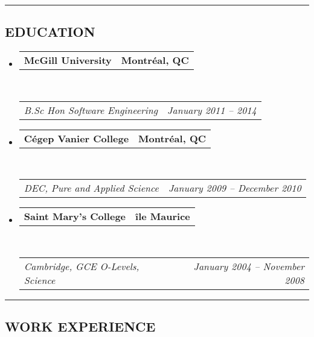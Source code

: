 \documentclass[10pt,letterpaper]{article}
\makeatletter
\newcommand{\headerrow}[2]
{\begin{tabular*}{\linewidth}{l@{\extracolsep{\fill}}r}
	#1 &
	#2 \\
\end{tabular*}}
\makeatother
\begin{document}
\hrule
\vspace{-0.4em}
\subsection*{EDUCATION}

\begin{itemize}
	\parskip=0.1em

	\item
	\headerrow
		{\textbf{McGill University}}
		{\textbf{Montr\'{e}al, QC}}
	\\
	\headerrow
		{\emph{B.Sc Hon Software Engineering}}
		{\emph{January 2011 -- 2014}}

	\item
	\headerrow
		{\textbf{C\'{e}gep Vanier College}}
		{\textbf{Montr\'{e}al, QC}}
	\\
	\headerrow
		{\emph{DEC, Pure and Applied Science}}
		{\emph{January 2009 -- December 2010}}

	\item
	\headerrow
		{\textbf{Saint Mary's College}}
		{\textbf{\^{i}le Maurice}}
	\\
	\headerrow
		{\emph{Cambridge, GCE O-Levels, Science}}
		{\emph{January 2004 -- November 2008}}
\end{itemize}


\hrule
\vspace{-0.4em}
\subsection*{WORK EXPERIENCE}
\end{document}
